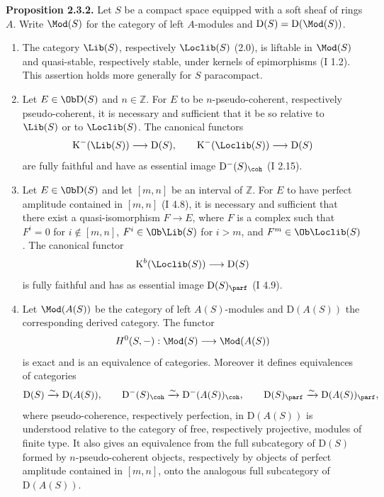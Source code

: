 \documentclass[11pt]{article}
\begin{document}
\textbf{Proposition 2.3.2.} Let $S$ be a compact space equipped with a soft sheaf of rings $A$. Write $\Mod(S)$ for the category of left $A$-modules and $\mathrm D(S)=\mathrm D(\Mod(S))$.
\begin{enumerate}[label=\alph*)]
\item The category $\Lib(S)$, respectively $\Loclib(S)$ (2.0), is liftable in $\Mod(S)$ and quasi-stable, respectively stable, under kernels of epimorphisms (I 1.2). This assertion holds more generally for $S$ paracompact.
\item Let $E\in\Ob\mathrm D(S)$ and $n\in\mathbb Z$. For $E$ to be $n$-pseudo-coherent, respectively pseudo-coherent, it is necessary and sufficient that it be so relative to $\Lib(S)$ or to $\Loclib(S)$. The canonical functors
\[
\mathrm K^{-}(\Lib(S))\longrightarrow \mathrm D(S),
\qquad
\mathrm K^{-}(\Loclib(S))\longrightarrow \mathrm D(S)
\]
are fully faithful and have as essential image $\mathrm D^{-}(S)_{\coh}$ (I 2.15).
\item Let $E\in\Ob\mathrm D(S)$ and let $[m,n]$ be an interval of $\mathbb Z$. For $E$ to have perfect amplitude contained in $[m,n]$ (I 4.8), it is necessary and sufficient that there exist a quasi-isomorphism $F\to E$, where $F$ is a complex such that $F^i=0$ for $i\notin[m,n]$, $F^i\in\Ob\Lib(S)$ for $i>m$, and $F^m\in\Ob\Loclib(S)$. The canonical functor
\[
\mathrm K^b(\Loclib(S))\longrightarrow \mathrm D(S)
\]
is fully faithful and has as essential image $\mathrm D(S)_{\parf}$ (I 4.9).
\item Let $\Mod(A(S))$ be the category of left $A(S)$-modules and $\mathrm D(A(S))$ the corresponding derived category. The functor
\[
H^0(S,-):\Mod(S)\longrightarrow\Mod(A(S))
\]
is exact and is an equivalence of categories. Moreover it defines equivalences of categories
\[
\mathrm D(S)\xrightarrow{\sim}\mathrm D(A(S)),\qquad
\mathrm D^{-}(S)_{\coh}\xrightarrow{\sim}\mathrm D^{-}(A(S))_{\coh},\qquad
\mathrm D(S)_{\parf}\xrightarrow{\sim}\mathrm D(A(S))_{\parf},
\]
where pseudo-coherence, respectively perfection, in $\mathrm D(A(S))$ is understood relative to the category of free, respectively projective, modules of finite type. It also gives an equivalence from the full subcategory of $\mathrm D(S)$ formed by $n$-pseudo-coherent objects, respectively by objects of perfect amplitude contained in $[m,n]$, onto the analogous full subcategory of $\mathrm D(A(S))$.
\end{enumerate}
\end{document}
